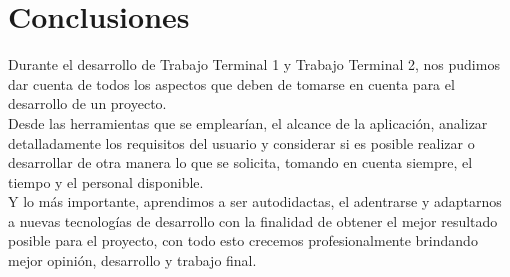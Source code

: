 \chapter*{Conclusiones}
{}
	\noindent 
	Durante el desarrollo de Trabajo Terminal 1 y Trabajo Terminal 2, nos pudimos dar cuenta de todos los aspectos que deben de tomarse en cuenta para el desarrollo de un proyecto. \\
	Desde las herramientas que se emplearían, el alcance de la aplicación, analizar detalladamente los requisitos del usuario y considerar si es posible realizar o desarrollar de otra manera lo que se solicita, tomando en cuenta siempre, el tiempo y el personal
	disponible.\\
	Y lo más importante, aprendimos a ser autodidactas, el adentrarse y adaptarnos a nuevas tecnologías de desarrollo con la finalidad de obtener el mejor resultado posible para el proyecto, con todo esto crecemos profesionalmente brindando mejor opinión, desarrollo
	y trabajo final. \\
	